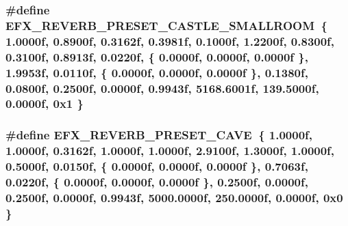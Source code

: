 \subsubsection[{\texorpdfstring{E\+F\+X\+\_\+\+R\+E\+V\+E\+R\+B\+\_\+\+P\+R\+E\+S\+E\+T\+\_\+\+C\+A\+S\+T\+L\+E\+\_\+\+S\+M\+A\+L\+L\+R\+O\+OM}{EFX_REVERB_PRESET_CASTLE_SMALLROOM}}]{\setlength{\rightskip}{0pt plus 5cm}\#define E\+F\+X\+\_\+\+R\+E\+V\+E\+R\+B\+\_\+\+P\+R\+E\+S\+E\+T\+\_\+\+C\+A\+S\+T\+L\+E\+\_\+\+S\+M\+A\+L\+L\+R\+O\+OM~\{ 1.\+0000f, 0.\+8900f, 0.\+3162f, 0.\+3981f, 0.\+1000f, 1.\+2200f, 0.\+8300f, 0.\+3100f, 0.\+8913f, 0.\+0220f, \{ 0.\+0000f, 0.\+0000f, 0.\+0000f \}, 1.\+9953f, 0.\+0110f, \{ 0.\+0000f, 0.\+0000f, 0.\+0000f \}, 0.\+1380f, 0.\+0800f, 0.\+2500f, 0.\+0000f, 0.\+9943f, 5168.\+6001f, 139.\+5000f, 0.\+0000f, 0x1 \}}\hypertarget{efx-presets_8h_a9e21af4806035fc51af8fe4afadd1189}{}\label{efx-presets_8h_a9e21af4806035fc51af8fe4afadd1189}
\subsubsection[{\texorpdfstring{E\+F\+X\+\_\+\+R\+E\+V\+E\+R\+B\+\_\+\+P\+R\+E\+S\+E\+T\+\_\+\+C\+A\+VE}{EFX_REVERB_PRESET_CAVE}}]{\setlength{\rightskip}{0pt plus 5cm}\#define E\+F\+X\+\_\+\+R\+E\+V\+E\+R\+B\+\_\+\+P\+R\+E\+S\+E\+T\+\_\+\+C\+A\+VE~\{ 1.\+0000f, 1.\+0000f, 0.\+3162f, 1.\+0000f, 1.\+0000f, 2.\+9100f, 1.\+3000f, 1.\+0000f, 0.\+5000f, 0.\+0150f, \{ 0.\+0000f, 0.\+0000f, 0.\+0000f \}, 0.\+7063f, 0.\+0220f, \{ 0.\+0000f, 0.\+0000f, 0.\+0000f \}, 0.\+2500f, 0.\+0000f, 0.\+2500f, 0.\+0000f, 0.\+9943f, 5000.\+0000f, 250.\+0000f, 0.\+0000f, 0x0 \}}\hypertarget{efx-presets_8h_a0ca71faa4923155557a0b9a8c5227775}{}\label{efx-presets_8h_a0ca71faa4923155557a0b9a8c5227775}
